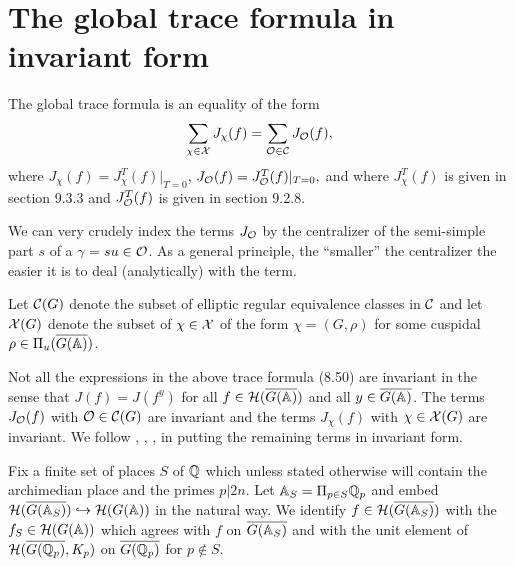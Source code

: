 
\section{The global trace formula in invariant form}

The global trace formula is an equality of the form 
\begin{equation}
\sum_{\chi \in {\cal X}}J_\chi (f) =\sum_{{\cal{O}}\in {\cal C}}
J_{{\cal{O}}}(f),
\end{equation}
where $J_\chi (f)=J_\chi ^T(f)|_{T=0}$,
$J_{{\cal{O}}}(f)=J_{{\cal{O}}}^T(f)|_{T=0},$ and where
$J_\chi ^T(f)$ is given in section 9.3.3 and
$J_{{\cal{O}}}^T(f)$ is given in section 9.2.8.

We can very crudely index the terms $J_{\cal{O}}$ by the centralizer
of the semi-simple part $s$ of a $\gamma =su\in {\cal{O}}$. As a
general principle, the ``smaller'' the centralizer the easier it is
to deal (analytically) with the term. 

Let ${\cal C}(G)$ denote the subset
of elliptic regular equivalence classes in ${\cal C}$ and let
${\cal{X}}(G)$
denote the subset of $\chi \in {\cal{X}}$ of the form $\chi=(G,\rho )$ for
some cuspidal
$\rho \in \Pi _u(\overline{G({\Bbb {A}})})$.

Not all the expressions in the above trace formula (8.50)
are invariant in the sense that $J(f)=J(f^y)$ for all
$f\in {\cal{H}}(\overline{G({\Bbb {A}})}) $ and all
$y\in \overline{G({\Bbb {A}})}$. The terms $J_{{\cal{O}}}(f)$
with ${\cal{O}}\in {\cal{C}}(G)$ are invariant and the terms
$J_\chi (f)$ with $\chi \in {\cal{X}}(G)$ are invariant.
We follow \cite{A6}, \cite{A9}, \cite{A10}, in putting
the remaining terms in invariant form.

Fix a finite set of places $S$ of ${\Bbb {Q}}$ which
unless stated otherwise
will contain the archimedian place and the primes $p|2n$.
Let ${\Bbb {A}}_S=\Pi _{p\in S}{\Bbb {Q}}_p$ and embed
${\cal{H}}(\overline{G({\Bbb{A}}_S)})
\hookrightarrow {\cal{H}}(G({\Bbb {A}))}$
in the natural way. We identify $f\in {\cal{H}}(\overline{G({\Bbb{A}}_S)})$
with the $f_S\in {\cal{H}}(G({\Bbb {A}}))$ which agrees
with $f$ on $\overline{G({\Bbb{A}}_S)}$ and with the unit
element of ${\cal{H}}(\overline{G({\Bbb{Q}}_p)},K_p)$
on $\overline{G({\Bbb{Q}}_p)} $ for $p\notin S$.

